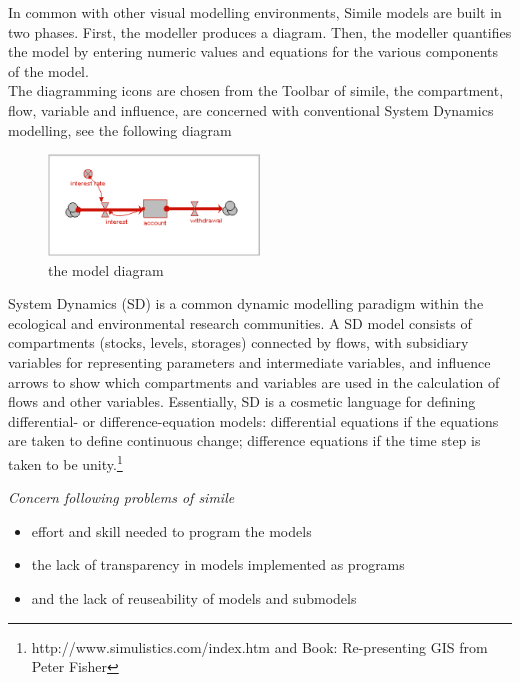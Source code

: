 In common with other visual modelling environments, Simile models are built in two phases. First, the modeller produces a diagram. Then, the modeller quantifies the model by entering numeric values and equations for the various components of the model.\\
The diagramming icons are chosen from the Toolbar of simile, the compartment, flow, variable and influence, are concerned with conventional System Dynamics modelling, see the following diagram\\

\begin{figure}[htbp]
\centering
\includegraphics[width=0.5\textwidth]{pics/account_example.png}
\caption{the model diagram}
\label{fig:the model diagram}	
\end{figure}

System Dynamics (SD) is a common dynamic modelling paradigm within the ecological and environmental research communities. A SD model consists of compartments (stocks, levels, storages) connected by flows, with subsidiary variables for representing parameters and intermediate variables, and influence arrows to show which compartments and variables are used in the calculation of flows and other variables. Essentially, SD is a cosmetic language for defining differential- or difference-equation models: differential equations if the equations are taken to define continuous change; difference equations if the time step is taken to be unity.\footnote{http://www.simulistics.com/index.htm and Book: Re-presenting GIS from Peter Fisher}

\emph{Concern following problems of simile}
\begin{itemize}
	\item effort and skill needed to program the models
	\item the lack of transparency in models implemented as programs
	\item and the lack of reuseability of models and submodels
\end{itemize}
	
